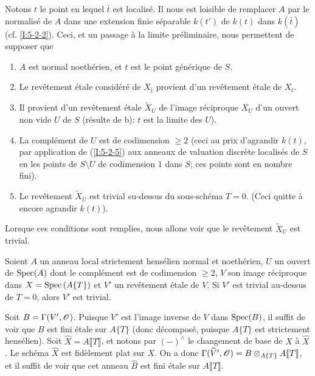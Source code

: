 \documentclass[oneside]{book}
\begin{document}
Notons $t$ le point en lequel $\bar t$ est localisé. Il nous est loisible de 
remplacer $A$ par le normalisé de $A$ dans une extension finie séparable 
$k(t')$ de $k(t)$ dans $k(\bar t)$ (cf. \ref{I:5-2-2}). Ceci, et un passage à 
la limite préliminaire, nous permettent de supposer que 
\begin{enumerate}[\indent a)]
  \item $A$ est normal noethérien, et $t$ est le point générique de $S$.
  \item Le revêtement étale considéré de $X_{\bar t}$ provient d'un 
    revêtement étale de $X_t$. 
  \item Il provient d'un revêtement étale $\widetilde X_U$ de l'image 
    réciproque $X_U$ d'un ouvert non vide $U$ de $S$ (résulte de b): $t$ 
    est la limite des $U$).
  \item La complément de $U$ est de codimension $\geqslant 2$ (ceci au prix 
    d'agrandir $k(t)$, par application de (\ref{I:5-2-5}) aux anneaux de 
    valuation discrète localisés de $S$ en les points de $S\setminus U$ de 
    codimension $1$ dans $S$; ces points sont en nombre fini). 
  \item Le revêtement $\widetilde X_U$ est trivial su-dessus du sous-schéma 
    $T=0$. (Ceci quitte à encore agrandir $k(t)$). 
\end{enumerate}

Lorsque ces conditions sont remplies, nous allons voir que le revêtement 
$\widetilde X_U$ est trivial. 





\begin{lemma}\label{I:5-2-7} %
Soient $A$ un anneau local strictement hensélien normal et noethérien, $U$ 
un ouvert de $\operatorname{Spec}(A)$ dont le complément est de codimension $\geqslant 2$, 
$V$ son image réciproque dans $X=\operatorname{Spec}\left(A\{T\}\right)$ et $V'$ un 
revêtement étale de $V$. Si $V'$ est trivial au-dessus de $T=0$, alors $V'$ 
est trivial. 
\end{lemma}

Soit $B=\Gamma(V',\mathscr{O})$. Puisque $V'$ est l'image inverse de $V$ dans 
$\operatorname{Spec}(B)$, il suffit de voir que $B$ est fini étale sur $A\{T\}$ (donc 
décomposé, puisque $A\{T\}$ est strictement hensélien). Soit 
$\widehat X=A\llbracket T\rrbracket$, et notons par $(-)^\wedge$ le changement 
de base de $X$ à $\widehat X$. Le schéma $\widehat X$ est fidèlement plat 
sur $X$. On a donc 
$\Gamma(\widehat V',\mathscr{O}) = B\otimes_{A\{T\}} A\llbracket T\rrbracket$, et il 
suffit de voir que cet anneau $\widehat B$ est fini étale sur 
$A\llbracket T\rrbracket$. 
\end{document}
